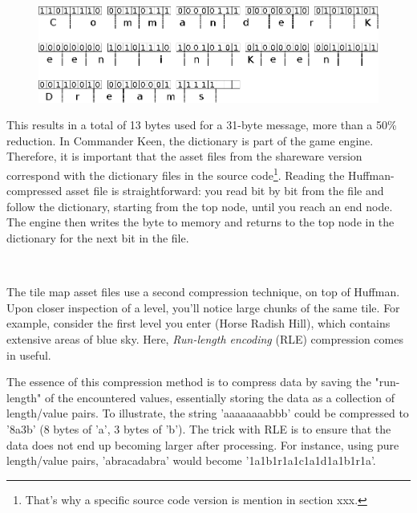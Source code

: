 \documentclass[book.tex]{subfiles}
\begin{document}
\begin{figure}[H]
\centering
 \includegraphics[width=\textwidth]{imgs/drawings/huffman_decode.eps}
 \end{figure}

 \par
This results in a total of 13 bytes used for a 31-byte message, more than a 50\% reduction. In Commander Keen, the dictionary is part of the game engine. Therefore, it is important that the asset files from the shareware version correspond with the dictionary files in the source code\footnote{That's why a specific source code version is mention in section xxx.}. Reading the Huffman-compressed asset file is straightforward: you read bit by bit from the file and follow the dictionary, starting from the top node, until you reach an end node. The engine then writes the byte to memory and returns to the top node in the dictionary for the next bit in the file.\\

\par
\begin{minipage}{\textwidth}
 \par
 \end{minipage}\\

\par
The tile map asset files use a second compression technique, on top of Huffman. Upon closer inspection of a level, you'll notice large chunks of the same tile. For example, consider the first level you enter (Horse Radish Hill), which contains extensive areas of blue sky. Here, \textit{Run-length encoding} (RLE) compression comes in useful.\\

\par
The essence of this compression method is to compress data by saving the "run-length" of the encountered values, essentially storing the data as a collection of length/value pairs. To illustrate, the string 'aaaaaaaabbb' could be compressed to '8a3b' (8 bytes of 'a', 3 bytes of 'b'). The trick with RLE is to ensure that the data does not end up becoming larger after processing. For instance, using pure length/value pairs, 'abracadabra' would become '1a1b1r1a1c1a1d1a1b1r1a'.\\
\end{document}
